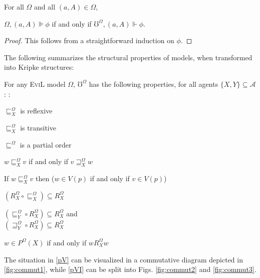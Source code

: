 \begin{lemma}
  \label{tranlemma1} For all $\Omega$ and all $(a, A) \in \Omega$,  
\begin{center} 
$\Omega, (a, A) \VDash \phi$ if and only if $\mho^{\Omega}, (a, A) \Vdash \phi$.
\end{center}
\end{lemma}
\begin{proof}
  This follows from a straightforward induction on $\phi$.
\end{proof}
The following summarizes the structural properties of
 models, when transformed into Kripke structures:
\begin{proposition}\label{evil_models}
  For any \textsc{EviL} model $\Omega$,  $\mho^{\Omega}$ has the following
  properties, for all agents $\{X,Y\} \subseteq \mathcal{A}$:
:
  \begin{myRoman}
    \item\label{pI} $\sqsubseteq^{\Omega}_X$ is reflexive
    \item\label{pII} $\sqsubseteq^{\Omega}_X$ is transitive 
   \item \label{pantisym} $\sqsubseteq^{\Omega}$ is a partial order
    \item \label{preverse} $w \sqsubseteq^{\Omega}_X v$ if and only if 
     $v \sqsupseteq^{\Omega}_X w$
    \item \label{pislandiff} If $w \sqsubseteq^{\Omega}_X v$ then ($w
      \in V (p)$ if and only if $v \in V (p)$)
    \item \label{pV}$(R^{\Omega}_X \circ \sqsubseteq^{\Omega}_X) \subseteq R^{\Omega}_X$
    \item \label{pVI} $(\sqsubseteq^{\Omega}_Y \circ R^{\Omega}_X)
      \subseteq R^{\Omega}_X$ and\\
    $(\sqsupseteq^{\Omega}_Y \circ R^{\Omega}_X) \subseteq R^{\Omega}_X$
    \item\label{pVII} $w \in P^{\Omega} (X)$ if and only if $w
    R^{\Omega}_X w$
  \end{myRoman}
  The situation in \ref{pV} can be visualized in a commutative diagram
  depicted in
  \ref{fig:commut1}, while \ref{pVI} can be split into
  Figs. \ref{fig:commut2} and \ref{fig:commut3}.
\end{proposition}
